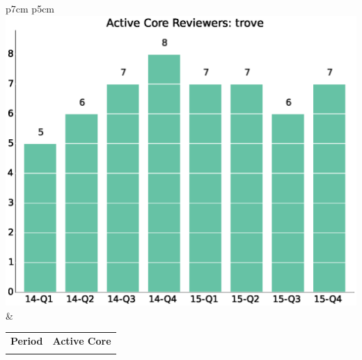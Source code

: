 \documentclass[a4wide,11pt]{article}
\begin{document}
\begin{tabular}{p{7cm} p{5cm}}
    \vspace{0pt} 
    \includegraphics[scale=.35]{figs/active_core_scrtrove.eps}
    & 
    \vspace{0pt}
    \begin{tabular}{l|l}%
    \bfseries Period & \bfseries Active Core %
    \csvreader[head to column names]{data/active_core_scrtrove.csv}{}%
    {\\ & \activecorereviewers}
    \end{tabular}
\end{tabular}
\end{document}
